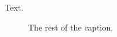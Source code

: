 \documentclass{bmcmini}
\begin{document}
\begin{abstract}
 Some background.
 Some methods.
\end{abstract}
Text.
\begin{figure}[h]
\caption{ The rest of the caption.}
\end{figure}
\end{document}
